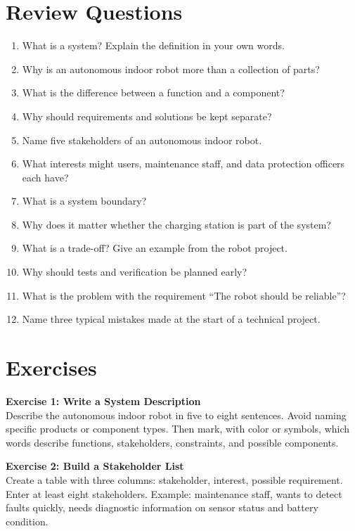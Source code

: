 \section{Review Questions}
\begin{enumerate}
    \item What is a system? Explain the definition in your own words.
    \item Why is an autonomous indoor robot more than a collection of parts?
    \item What is the difference between a function and a component?
    \item Why should requirements and solutions be kept separate?
    \item Name five stakeholders of an autonomous indoor robot.
    \item What interests might users, maintenance staff, and data protection officers each have?
    \item What is a system boundary?
    \item Why does it matter whether the charging station is part of the system?
    \item What is a trade-off? Give an example from the robot project.
    \item Why should tests and verification be planned early?
    \item What is the problem with the requirement \enquote{The robot should be reliable}?
    \item Name three typical mistakes made at the start of a technical project.
\end{enumerate}

\section{Exercises}
\begin{uebungbox}
\textbf{Exercise 1: Write a System Description}\\
Describe the autonomous indoor robot in five to eight sentences. Avoid naming specific products or component types. Then mark, with color or symbols, which words describe functions, stakeholders, constraints, and possible components.
\end{uebungbox}

\begin{uebungbox}
\textbf{Exercise 2: Build a Stakeholder List}\\
Create a table with three columns: stakeholder, interest, possible requirement. Enter at least eight stakeholders. Example: maintenance staff, wants to detect faults quickly, needs diagnostic information on sensor status and battery condition.
\end{uebungbox}

